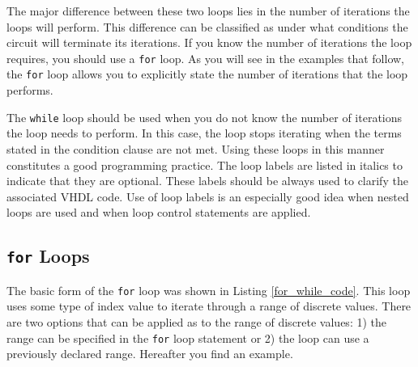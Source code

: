 The major difference between these two loops lies in the number of iterations the loops will perform. This difference can be classified as under what conditions the circuit will terminate its iterations. If you know the number of iterations the loop requires, you should use a \texttt{for} loop. As you will see in the examples that follow, the \texttt{for} loop allows you to explicitly state the number of iterations that the loop performs. 

The \texttt{while} loop should be used when you do not know the number of iterations the loop needs to perform. In this case, the loop stops iterating when the terms stated in the condition clause are not met. Using these loops in this manner constitutes a good programming practice. The loop labels are listed in italics to indicate that they are optional. These labels should be always used to clarify the associated VHDL code. Use of loop labels is an especially good idea when nested loops are used and when loop control statements are applied. 

\subsection{\texttt{for} Loops}
The basic form of the \texttt{for} loop was shown in Listing \ref{for_while_code}. This loop uses some type of index value to iterate through a range of discrete values. There are two options that can be applied as to the range of discrete values: 1) the range can be specified in the \texttt{for} loop statement or 2) the loop can use a previously declared range. Hereafter you find  an example.


